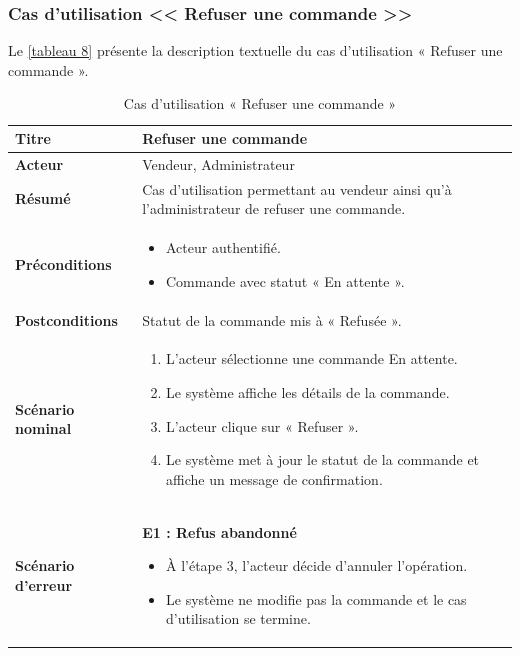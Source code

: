 \subsubsection{Cas d'utilisation << Refuser une commande >>}

Le \autoref{tableau 8} présente la description textuelle du cas d'utilisation « Refuser une commande ».

\begin{table}[H]
\centering
\renewcommand{\arraystretch}{1.4}
\begin{tabular}{|p{4cm}|p{10cm}|}
\hline
\textbf{Titre} & Refuser une commande \\
\hline
\textbf{Acteur} & Vendeur, Administrateur \\
\hline
\textbf{Résumé} & Cas d'utilisation permettant au vendeur ainsi qu'à l'administrateur de refuser une commande. \\
\hline
\textbf{Préconditions} &
\vspace{-12pt}
\begin{itemize}
    \item Acteur authentifié.
    \item Commande avec statut « En attente ».
\end{itemize} \\
\hline
\textbf{Postconditions} & Statut de la commande mis à « Refusée ». \\
\hline
\textbf{Scénario nominal} &
\vspace{-12pt}
\begin{enumerate}
    \item L'acteur sélectionne une commande En attente.
    \item Le système affiche les détails de la commande.
    \item L'acteur clique sur « Refuser ».
    \item Le système met à jour le statut de la commande et affiche un message de confirmation.
\end{enumerate} \\
\hline
\textbf{Scénario d'erreur} &
\vspace{-12pt}
\textbf{E1 : Refus abandonné}
\begin{itemize}
    \item À l'étape 3, l'acteur décide d'annuler l'opération.
    \item Le système ne modifie pas la commande et le cas d'utilisation se termine.
\end{itemize} \\
\hline
\end{tabular}
\caption{Cas d'utilisation « Refuser une commande »}
\label{tableau 8}
\end{table}

